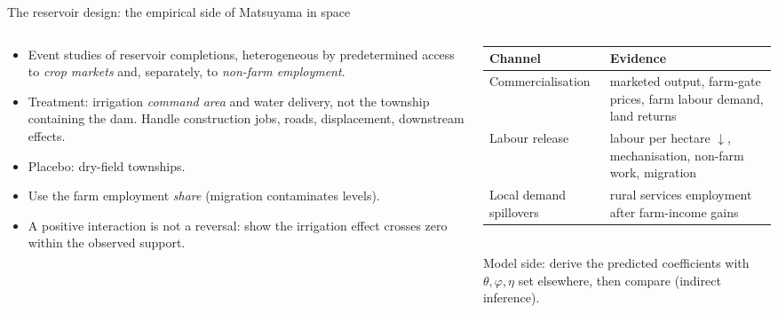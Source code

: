 \documentclass[10pt,aspectratio=169]{beamer}
\newcommand{\hl}[1]{\textcolor{mOrange}{#1}}
\begin{document}
\begin{frame}{The reservoir design: the empirical side of Matsuyama in space}
  \small
  \begin{columns}[T]
    \begin{column}{0.5\textwidth}
      \begin{itemize}
        \item Event studies of reservoir completions, heterogeneous by \hl{predetermined}
              access to \emph{crop markets} and, \hl{separately}, to \emph{non-farm
              employment}.
        \item Treatment: irrigation \emph{command area} and water delivery, not the
              township containing the dam. Handle construction jobs, roads,
              displacement, downstream effects.
        \item Placebo: dry-field townships.
        \item Use the farm employment \emph{share} (migration contaminates levels).
        \item A positive interaction is not a reversal: show the irrigation effect
              \hl{crosses zero} within the observed support.
      \end{itemize}
    \end{column}
    \begin{column}{0.46\textwidth}
      \footnotesize
      \begin{tabular}{@{}L{0.3\textwidth}L{0.62\textwidth}@{}}
        \toprule
        Channel & Evidence \\
        \midrule
        Commercia\-lisation & marketed output, farm-gate prices, farm labour demand,
          land returns \\
        Labour release & labour per hectare $\downarrow$, mechanisation, non-farm work,
          migration \\
        Local demand spillovers & rural services employment after farm-income gains \\
        \bottomrule
      \end{tabular}\\[0.4em]
      \small Model side: derive the predicted coefficients with $\theta,\varphi,\eta$ set
      elsewhere, then compare (indirect inference).
    \end{column}
  \end{columns}
\end{frame}
\end{document}
